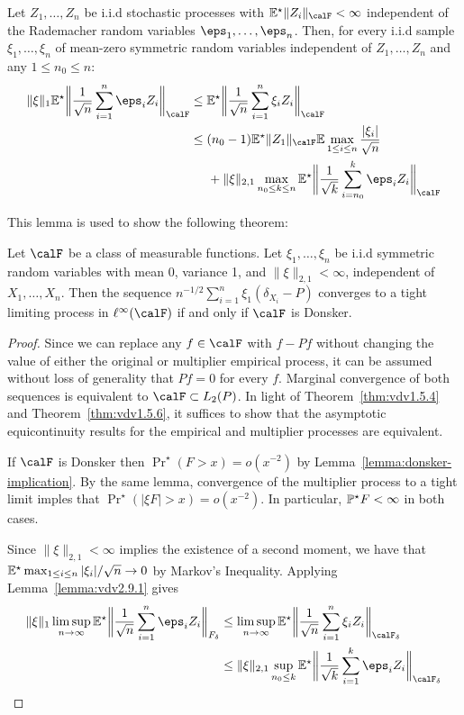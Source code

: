\begin{lemma}
	\label{lemma:vdv2.9.1}
	Let \(Z_1,\dots,Z_n\) be i.i.d stochastic processes with \(\E^\star\|Z_i\|_\calF<\infty\) independent of the Rademacher random variables \(\eps_1,\dots,\eps_n\). Then, for every i.i.d sample \(\xi_1,\dots,\xi_n\) of mean-zero symmetric random variables independent of \(Z_1,\dots,Z_n\) and any \(1\leq n_0\leq n\):
	\begin{align*}
		\|\xi\|_1\E^\star\bigg\|\frac{1}{\sqrt{n}}\sum_{i=1}^n \eps_iZ_i\bigg\|_\calF 
		&\leq \E^\star\bigg\|\frac{1}{\sqrt{n}}\sum_{i=1}^n \xi_iZ_i\bigg\|_\calF \\
		&\leq (n_0-1)\E^\star\|Z_1\|_\calF\E\max_{1\leq i\leq n}\frac{|\xi_i|}{\sqrt{n}} \\ 
		&\;\;\;\;\;+ \|\xi\|_{2,1}\max_{n_0\leq k\leq n}\E^\star\bigg\|\frac{1}{\sqrt{k}}\sum_{i=n_0}^k\eps_iZ_i \bigg\|_\calF 
	\end{align*}
\end{lemma}

This lemma is used to show the following theorem: 
\begin{theorem}
	\label{thm:vdv2.9.2}
	Let \(\calF\) be a class of measurable functions. Let \(\xi_1,\dots,\xi_n\) be i.i.d symmetric random variables with mean 0, variance 1, and \(\|\xi\|_{2,1} < \infty\), independent of \(X_1,\dots,X_n\). Then the sequence \(n^{-1/2}\sum_{i=1}^n \xi_1(\delta_{X_i}-P)\) converges to a tight limiting process in \(\ell^\infty(\calF)\) if and only if \(\calF\) is Donsker.
\end{theorem}
\begin{proof}
	Since we can replace any \(f\in\calF\) with \(f-Pf\) without changing the value of either the original or multiplier empirical process, it can be assumed without loss of generality that \(Pf=0\) for every \(f\). Marginal convergence of both sequences is equivalent to \(\calF\subset L_2(P)\). In light of Theorem~\ref{thm:vdv1.5.4} and Theorem~\ref{thm:vdv1.5.6}, it suffices to show that the asymptotic equicontinuity results for the empirical and multiplier processes are equivalent.

	If \(\calF\) is Donsker then \(\Pr^\star\left(F>x\right)=o(x^{-2})\) by Lemma~\ref{lemma:donsker-implication}. By the same lemma, convergence of the multiplier process to a tight limit imples that \(\Pr^\star\left(|\xi F|>x\right)=o(x^{-2})\). In particular, \(\P^\star F <\infty\) in both cases. 

	Since \(\|\xi\|_{2,1}<\infty\) implies the existence of a second moment, we have that \(\E^\star\max_{1\leq i\leq n}|\xi_i|/\sqrt{n}\to 0\) by Markov's Inequality. Applying Lemma~\ref{lemma:vdv2.9.1} gives
	\begin{align*}
	   \|\xi\|_1\limsup_{n\to\infty}\E^\star\bigg\|\frac{1}{\sqrt{n}}\sum_{i=1}^n \eps_iZ_i\bigg\|_{F_\delta} 	
	   &\leq \limsup_{n\to\infty}\E^\star\bigg\|\frac{1}{\sqrt{n}}\sum_{i=1}^n \xi_iZ_i\bigg\|_{\calF_\delta} \\
	   &\leq \|\xi\|_{2,1}\sup_{n_0\leq k}\E^\star\bigg\|\frac{1}{\sqrt{k}}\sum_{i=1}^k\eps_iZ_i\bigg\|_{\calF_\delta}
	\end{align*} 
\end{proof}


